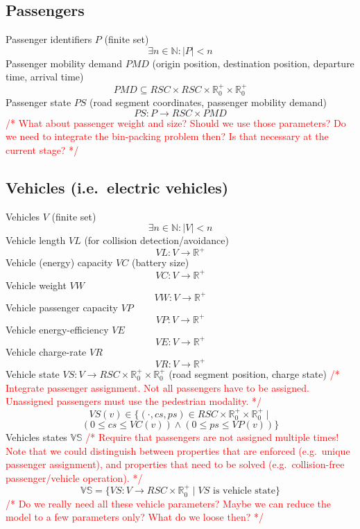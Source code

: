 \documentclass[conference]{IEEEtran}
\newcommand{\todo}[1]{\textcolor{red}{/* #1 */}}
\begin{document}
	\subsection{Passengers}
	\label{passengers}
	
	Passenger identifiers $P$ (finite set)
	\[
	\exists n \in \mathbb{N} : |P| < n
	\]
	Passenger mobility demand $PMD$ (origin position, destination position, departure time, arrival time)
	\[
		PMD \subseteq RSC \times RSC \times \mathbb{R}_0^+ \times \mathbb{R}_0^+
	\]
	Passenger state $PS$ (road segment coordinates, passenger mobility demand)
	\[
		PS : P \rightarrow RSC \times PMD
	\]
	\todo{What about passenger weight and size? Should we use those parameters? Do we need to integrate the bin-packing problem then? Is that necessary at the current stage?}
	
	\subsection{Vehicles (i.e.\ electric vehicles)}
	\label{vehicles}
	
	Vehicles $V$ (finite set)
	\[
		\exists n \in \mathbb{N} : |V| < n
	\]
	Vehicle length $VL$ (for collision detection/avoidance)
	\[
		VL : V \rightarrow \mathbb{R}^+
	\]
	Vehicle (energy) capacity $VC$ (battery size)
	\[
		VC : V \rightarrow \mathbb{R}^+
	\]
	Vehicle weight $VW$
	\[
		VW : V \rightarrow \mathbb{R}^+
	\]
	Vehicle passenger capacity $VP$
	\[
		VP : V \rightarrow \mathbb{R}^+
	\]
	Vehicle energy-efficiency $VE$ 
		\[
		VE : V \rightarrow \mathbb{R}^+
	\]
	Vehicle charge-rate $VR$ 
		\[
		VR : V \rightarrow \mathbb{R}^+
	\]
	Vehicle state $VS : V \rightarrow RSC \times \mathbb{R}_0^+ \times \mathbb{R}_0^+$ (road segment position, charge state) \todo{Integrate passenger assignment. Not all passengers have to be assigned. Unassigned passengers must use the pedestrian modality.}
	\[
		VS(v) \in \{ (\cdot, cs, ps) \in RSC \times \mathbb{R}_0^+ \times \mathbb{R}_0^+ \mid
	\]
	\[
		(0 \leq cs \leq VC(v)) \wedge (0 \leq ps \leq VP(v)) \}
	\]
	Vehicles states $\mathbb{VS}$ \todo{Require that passengers are not assigned multiple times! Note that we could distinguish between properties that are enforced (e.g.\ unique passenger assignment), and properties that need to be solved (e.g.\ collision-free passenger/vehicle operation).}
	\[
		\mathbb{VS} = \{VS : V \rightarrow RSC \times \mathbb{R}_0^+ \mid VS \text{ is vehicle state}\}
	\]
	\todo{Do we really need all these vehicle parameters? Maybe we can reduce the model to a few parameters only? What do we loose then?}
	
\end{document}
